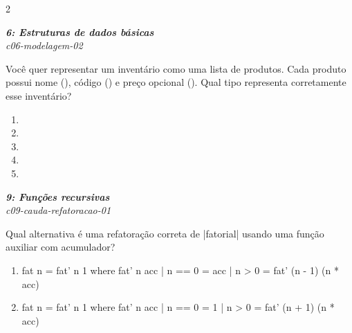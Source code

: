 \documentclass[a4paper,10pt,brazil]{article}
\begin{document}
\begin{multicols}{2}
\begin{flushright}
  \footnotesize
  \textit{\textbf{6: Estruturas de dados básicas}}\\
  \textit{c06-modelagem-02}\\

\end{flushright}
Você quer representar um inventário como uma lista de produtos. Cada produto possui nome (), código () e preço opcional (). Qual tipo representa corretamente esse inventário?

\begin{enumerate}
  \item {}

  \item {}

  \item {}

  \item {}

  \item {}


\end{enumerate}

\begin{flushright}
  \footnotesize
  \textit{\textbf{9: Funções recursivas}}\\
  \textit{c09-cauda-refatoracao-01}\\

\end{flushright}
Qual alternativa é uma refatoração correta de \haskellinline|fatorial| usando uma função auxiliar com acumulador?

\begin{enumerate}
  \item \begin{haskellcode}
fat n = fat' n 1
  where
    fat' n acc
      | n == 0 = acc
      | n > 0  = fat' (n - 1) (n * acc)
\end{haskellcode}

  \item \begin{haskellcode}
fat n = fat' n 1
  where
    fat' n acc
      | n == 0 = 1
      | n > 0  = fat' (n + 1) (n * acc)
\end{haskellcode}


\end{enumerate}
\end{multicols}
\end{document}
